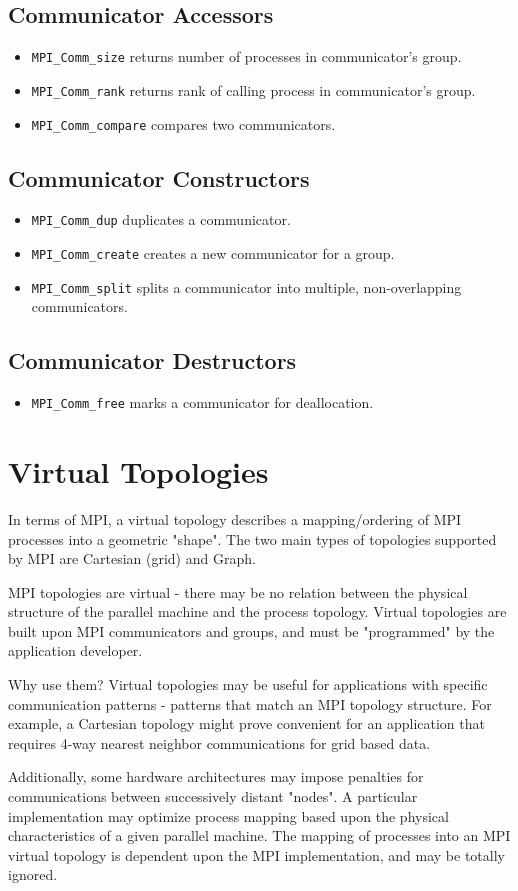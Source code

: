\subsection{Communicator Accessors}
\begin{itemize}
\item\texttt{MPI\_Comm\_size} returns number of processes in communicator's group.
\item\texttt{MPI\_Comm\_rank} returns rank of calling process in communicator's group.
\item\texttt{MPI\_Comm\_compare} compares two communicators.
\end{itemize}

\subsection{Communicator Constructors}
\begin{itemize}
\item\texttt{MPI\_Comm\_dup} duplicates a communicator.
\item\texttt{MPI\_Comm\_create} creates a new communicator for a group.
\item\texttt{MPI\_Comm\_split} splits a communicator into multiple, non-overlapping communicators.
\end{itemize}

\subsection{Communicator Destructors}
\begin{itemize}
\item\texttt{MPI\_Comm\_free} marks a communicator for deallocation.
\end{itemize}

\section{Virtual Topologies}
In terms of MPI, a virtual topology describes a mapping/ordering of MPI processes 
into a geometric "shape".  The two main types of topologies supported by MPI are Cartesian (grid) and 
Graph.  

MPI topologies are virtual - there may be no relation between the physical 
structure of the parallel machine and the process topology. Virtual topologies are built upon MPI communicators and groups, and must be "programmed" by the application developer.  

Why use them? Virtual topologies may be useful for applications with specific communication patterns - 
patterns that match an MPI topology structure.  For example, a Cartesian topology might prove convenient for an application that requires 4-way nearest neighbor communications for grid based data.  

Additionally, some hardware architectures may impose penalties for communications between 
successively distant "nodes".  A particular implementation may optimize process mapping based upon the physical characteristics of a given parallel machine.  The mapping of processes into an MPI virtual topology is dependent upon the MPI implementation, and may be totally ignored.